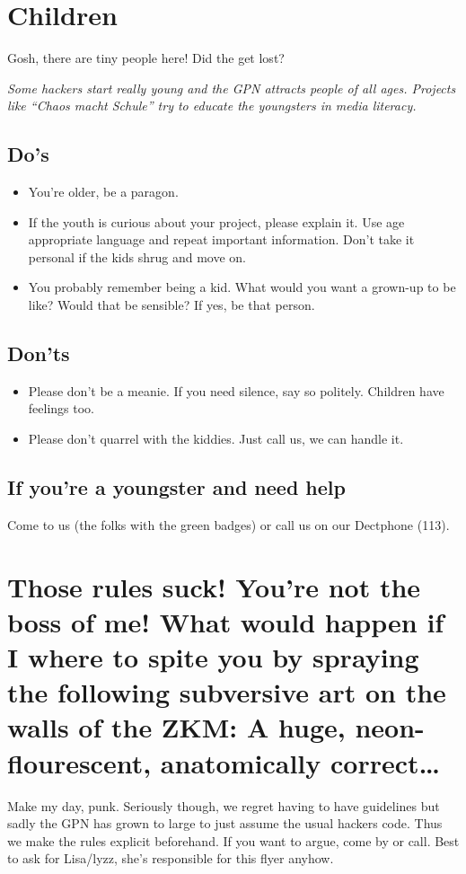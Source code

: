 \documentclass[10pt]{leaflet}
\begin{document}
\section{Children}
\label{sec-6}
Gosh, there are tiny people here! Did the get lost?

\emph{Some hackers start really young and the GPN attracts people of
  all ages. Projects like ``Chaos macht Schule'' try to educate
  the youngsters in media literacy.}

\subsection{Do's}
\label{sec-6-1}
\begin{itemize}
\item You're older, be a paragon.
\item If the youth is curious about your project, please explain
  it. Use age appropriate language and repeat important
  information. Don't take it personal if the kids shrug and move on.
\item You probably remember being a kid. What would you want a
  grown-up to be like? Would that be sensible? If yes, be that person.
\end{itemize}


\subsection{Don'ts}
\label{sec-6-2}
\begin{itemize}
\item Please don't be a meanie. If you need silence, say so
  politely. Children have feelings too.
\item Please don't quarrel with the kiddies. Just call us, we can handle it.
\end{itemize}
\subsection{If you're a youngster and need help}
Come to us (the folks with the green badges) or call us on our Dectphone (113).


\section{Those rules suck! You're not the boss of me! What would happen if I where to spite you by spraying the following subversive art on the walls of the ZKM: A huge, neon-flourescent, anatomically correct\ldots{}}

\label{sec-7}
Make my day, punk. Seriously though, we regret having to have
guidelines but sadly the GPN has grown to large to just assume the
usual hackers code. Thus we make the rules explicit beforehand. If you
want to argue, come by or call. Best to ask for Lisa/lyzz, she's
responsible for this flyer anyhow.
\end{document}
